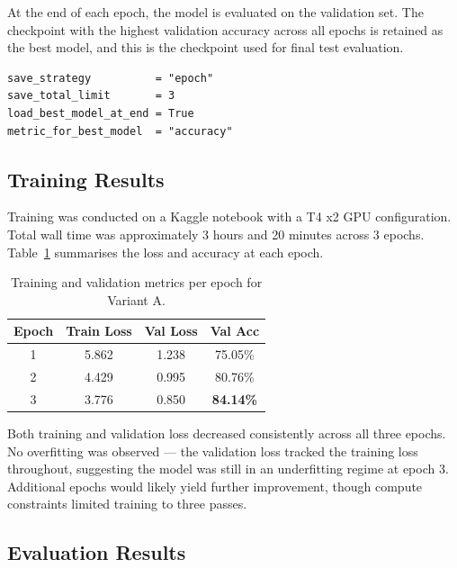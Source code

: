 At the end of each epoch, the model is evaluated on the validation set.
The checkpoint with the highest validation accuracy across all epochs is
retained as the best model, and this is the checkpoint used for final
test evaluation.

\begin{verbatim}
save_strategy          = "epoch"
save_total_limit       = 3
load_best_model_at_end = True
metric_for_best_model  = "accuracy"
\end{verbatim}

\subsection{Training Results}

Training was conducted on a Kaggle notebook with a T4 x2 GPU
configuration. Total wall time was approximately 3 hours and 20 minutes
across 3 epochs. Table~\ref{tab:training_results} summarises the loss
and accuracy at each epoch.

\begin{table}[H]
\centering
\caption{Training and validation metrics per epoch for Variant A.}
\label{tab:training_results}
\begin{tabular}{cccc}
\toprule
\textbf{Epoch} & \textbf{Train Loss} & \textbf{Val Loss} & \textbf{Val Acc} \\
\midrule
1 & 5.862 & 1.238 & 75.05\% \\
2 & 4.429 & 0.995 & 80.76\% \\
3 & 3.776 & 0.850 & \textbf{84.14\%} \\
\bottomrule
\end{tabular}
\end{table}

Both training and validation loss decreased consistently across all
three epochs. No overfitting was observed --- the validation loss
tracked the training loss throughout, suggesting the model was still
in an underfitting regime at epoch 3. Additional epochs would likely
yield further improvement, though compute constraints limited training
to three passes.

\subsection{Evaluation Results}

